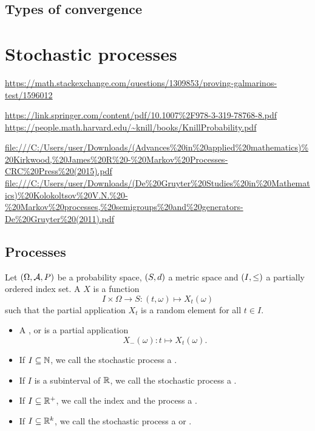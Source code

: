 \section{Types of convergence}

\chapter{Stochastic processes}
\url{https://math.stackexchange.com/questions/1309853/proving-galmarinos-test/1596012}

\url{https://link.springer.com/content/pdf/10.1007%2F978-3-319-78768-8.pdf}
\url{https://people.math.harvard.edu/~knill/books/KnillProbability.pdf}

\url{file:///C:/Users/user/Downloads/(Advances%20in%20applied%20mathematics)%20Kirkwood,%20James%20R%20-%20Markov%20Processes-CRC%20Press%20(2015).pdf}
\url{file:///C:/Users/user/Downloads/(De%20Gruyter%20Studies%20in%20Mathematics)%20Kolokoltsov%20V.N.%20-%20Markov%20processes,%20semigroups%20and%20generators-De%20Gruyter%20(2011).pdf}

\section{Processes}
\begin{definition}
Let $\left( \Omega, \mathcal{A}, P \right)$ be a probability space, $\left( S,d \right)$ a metric space and $\left( I,\leq \right)$ a partially ordered index set. A  $X$ is a function
\[ I\times \Omega \to S: (t,\omega) \mapsto X_t(\omega) \]
such that the partial application $X_t$ is a random element for all $t\in I$.
\begin{itemize}
\item A ,  or  is a partial application
\[ X_-(\omega): t\mapsto X_t(\omega). \]
\item If $I \subseteq \mathbb{N}$, we call the stochastic process a .
\item If $I$ is a subinterval of $\mathbb{R}$, we call the stochastic process a .
\item If $I\subseteq \mathbb{R}^+$, we call the index  and the process a .
\item If $I\subseteq \mathbb{R}^k$, we call the stochastic process a  or .
\end{itemize}
\end{definition}

